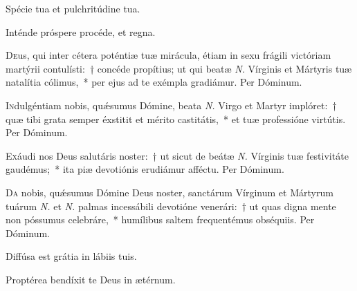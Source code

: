 \documentclass[vesperale_romanum.tex]{subfiles}
\begin{document}

\vel


\vv Spécie tua et pulchritúdine tua. \tpalleluia

\rr Inténde próspere procéde, et regna. \tpalleluia

\admagnificat
\label{an_veni_sponsa_christi_i_vesperis_solesmes_1961}


\lettrine{D}{e}us, qui inter cétera poténtiæ tuæ mirácula, étiam in sexu frágili vi\-ctóriam martýrii contulísti:~† concéde propítius; ut qui beatæ \textit{N.} Vírginis et Mártyris tuæ natalítia cólimus,~* per ejus ad te exémpla gradiámur. Per Dóminum.

\aliaoratio

\lettrine{I}{n}dulgéntiam nobis, quǽsumus Dómine, beata \textit{N.} Virgo et Martyr implóret:~† quæ tibi grata semper éxstitit et mérito castitátis,~* et tuæ professióne virtútis. Per Dóminum.



\lettrine{E}{x}áudi nos Deus salutáris noster:~† ut sicut de beátæ \textit{N.} Vírginis tuæ festivitáte gaudémus;~* ita piæ devotiónis erudiámur affé\-ctu.
Per Dóminum.


\label{an_prudentes_virgines_solesmes_1961}

\oratio

\lettrine{D}{a} nobis, quǽsumus Dómine Deus noster, san\-ctárum Vírginum et Mártyrum tuárum \textit{N.} et \textit{N.} palmas incessábili devotióne venerári:~† ut quas digna mente non póssumus celebráre,~* humílibus saltem frequentémus obséquiis. Per Dóminum.


\omniapraeter %

\vv Diffúsa est grátia in lábiis tuis. \tpalleluia

\rr Proptérea bendíxit te Deus in ætérnum. \tpalleluia

\admagnificat
\label{an_veni_sponsa_christi_ii_vesperis_solesmes_1961}
\end{document}
